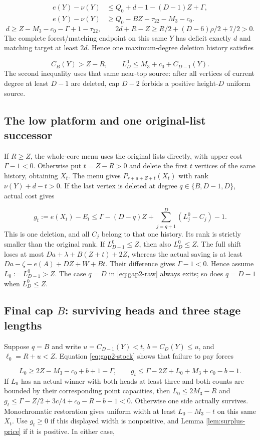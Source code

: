 \documentclass[11pt,a4paper]{article}
\theoremstyle{definition}
\begin{document}
\[
\begin{split}
e(Y)-\nu(Y)&\le Q_0+d-1-(D-1)Z+\Gamma,\\
e(Y)-\nu(Y)&\ge Q_0-BZ-\tau_{22}-M_3-c_0.
\end{split}
\]
\[
d\ge Z-M_3-c_0-\Gamma+1-\tau_{22},\qquad
2d+R-Z\ge R/2+(D-6)\rho/2+7/2>0.
\]
The complete forest/matching endpoint on this same $Y$ has deficit exactly
$d$ and matching target at least $2d$.
Hence one maximum-degree deletion history satisfies

\begin{equation}\label{eq:gap2-stock}
C_B(Y)>Z-R,\qquad L_D^0\le M_3+c_0+C_{D-1}(Y).
\end{equation}
The second inequality uses that same near-top source:
after all vertices of current degree at least $D-1$ are deleted,
cap $D-2$ forbids a positive height-$D$ uniform source.

\subsection{The low platform and one original-list successor}
If $R\ge Z$, the whole-core menu uses the original lists directly,
with upper cost $\Gamma-1<0$.
Otherwise put $t=Z-R>0$ and delete the first $t$ vertices of the same history,
obtaining $X_t$.
The menu gives $P_{r+a+Z+t}(X_t)$ with rank $\nu(Y)+d-t>0$.
If the last vertex is deleted at degree $q\in\{B,D-1,D\}$, actual cost gives

\begin{equation}\label{eq:gap2-raw}
g_t:=e(X_t)-E_t
\le\Gamma-(D-q)Z+\sum_{j=q+1}^{D}(L_j^0-C_j)-1.
\end{equation}
This is one deletion, and all $C_j$ belong to that one history.
Its rank is strictly smaller than the original rank.
If $L_{D-1}^0\le Z$, then also $L_D^0\le Z$.
The full shift loses at most $Da+\lambda+B(Z+t)+2Z$, whereas the
actual saving is at least $Da-\zeta-e(A)+DZ+W+Bt$.
Their difference gives $\Gamma-1<0$.
Hence assume $L_0:=L_{D-1}^0>Z$.
The case $q=D$ in \eqref{eq:gap2-raw} always exits;
so does $q=D-1$ when $L_D^0\le Z$.

\subsection{Final cap $B$: surviving heads and three stage lengths}
Suppose $q=B$ and write
$u=C_{D-1}(Y)<t$, $b=C_D(Y)\le u$, and $\ell_0=R+u<Z$.
Equation \eqref{eq:gap2-stock} shows that failure to pay forces

\begin{equation}\label{eq:gap2-L0}
L_0\ge2Z-M_3-c_0+b+1-\Gamma,\qquad
g_t\le\Gamma-2Z+L_0+M_3+c_0-b-1.
\end{equation}
If $L_0$ has an actual winner with both heads at least three and both
counts are bounded by their corresponding point capacities,
then $L_0\le2M_3-R$ and
$g_t\le\Gamma-Z/2+3c/4+c_0-R-b-1<0$.
Otherwise one side actually survives. Monochromatic restoration gives
uniform width at least $L_0-M_3-t$ on this same $X_t$.
Use $g_t\ge0$ if this displayed width is nonpositive, and
Lemma \ref{lem:surplus-price} if it is positive. In either case,
\end{document}

